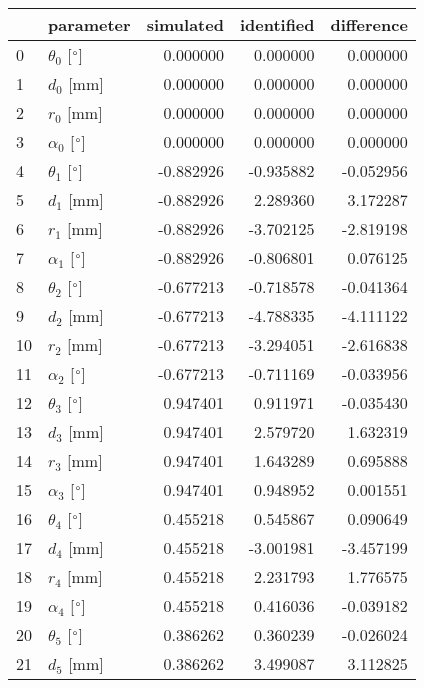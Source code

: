 \documentclass{standalone}%
\begin{document}
%
\normalsize%
\begin{tabular}{llrrr}
\toprule
{} &                 parameter & simulated & identified & difference \\
\midrule
0  &  $\theta_{0}$ [$\degree$] &  0.000000 &   0.000000 &   0.000000 \\
1  &              $d_{0}$ [mm] &  0.000000 &   0.000000 &   0.000000 \\
2  &              $r_{0}$ [mm] &  0.000000 &   0.000000 &   0.000000 \\
3  &  $\alpha_{0}$ [$\degree$] &  0.000000 &   0.000000 &   0.000000 \\
4  &  $\theta_{1}$ [$\degree$] & -0.882926 &  -0.935882 &  -0.052956 \\
5  &              $d_{1}$ [mm] & -0.882926 &   2.289360 &   3.172287 \\
6  &              $r_{1}$ [mm] & -0.882926 &  -3.702125 &  -2.819198 \\
7  &  $\alpha_{1}$ [$\degree$] & -0.882926 &  -0.806801 &   0.076125 \\
8  &  $\theta_{2}$ [$\degree$] & -0.677213 &  -0.718578 &  -0.041364 \\
9  &              $d_{2}$ [mm] & -0.677213 &  -4.788335 &  -4.111122 \\
10 &              $r_{2}$ [mm] & -0.677213 &  -3.294051 &  -2.616838 \\
11 &  $\alpha_{2}$ [$\degree$] & -0.677213 &  -0.711169 &  -0.033956 \\
12 &  $\theta_{3}$ [$\degree$] &  0.947401 &   0.911971 &  -0.035430 \\
13 &              $d_{3}$ [mm] &  0.947401 &   2.579720 &   1.632319 \\
14 &              $r_{3}$ [mm] &  0.947401 &   1.643289 &   0.695888 \\
15 &  $\alpha_{3}$ [$\degree$] &  0.947401 &   0.948952 &   0.001551 \\
16 &  $\theta_{4}$ [$\degree$] &  0.455218 &   0.545867 &   0.090649 \\
17 &              $d_{4}$ [mm] &  0.455218 &  -3.001981 &  -3.457199 \\
18 &              $r_{4}$ [mm] &  0.455218 &   2.231793 &   1.776575 \\
19 &  $\alpha_{4}$ [$\degree$] &  0.455218 &   0.416036 &  -0.039182 \\
20 &  $\theta_{5}$ [$\degree$] &  0.386262 &   0.360239 &  -0.026024 \\
21 &              $d_{5}$ [mm] &  0.386262 &   3.499087 &   3.112825 \\

\end{tabular}
\end{document}
